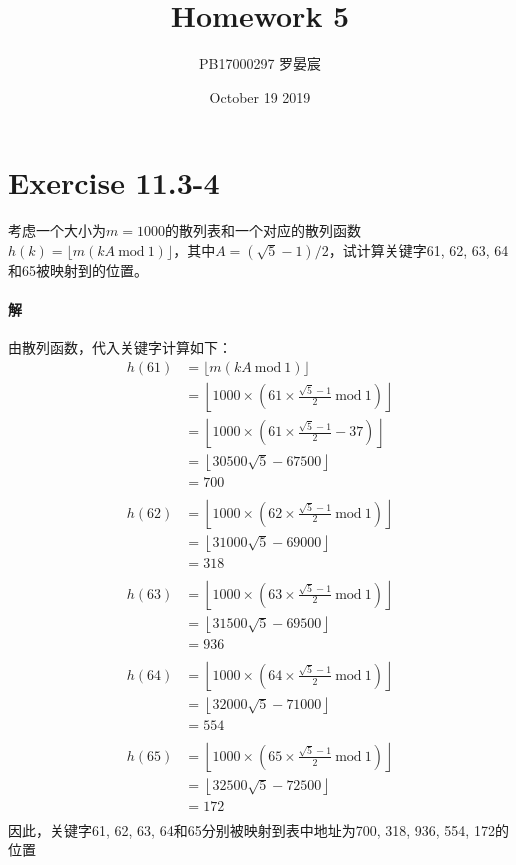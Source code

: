 \documentclass{article}
\title{Homework 5}
\author{PB17000297 罗晏宸}
\date{October 19 2019}
\begin{document}
\maketitle

\section{Exercise 11.3-4}
考虑一个大小为$m = 1000$的散列表和一个对应的散列函数$h(k) = \lfloor m(kA\ \text{mod}\ 1) \rfloor$，其中$A = (\sqrt{5} − 1)/2$，试计算关键字61, 62, 63, 64和65被映射到的位置。
\paragraph{解}
由散列函数，代入关键字计算如下：
\begin{align*}
    h(61)
        &= \lfloor m(kA\ \text{mod}\ 1) \rfloor \\
        &= \left \lfloor 1000 \times \left(61 \times \frac{\sqrt{5}-1}{2} \ \text{mod}\ 1 \right) \right \rfloor \\
        &= \left \lfloor 1000 \times \left( 61 \times \frac{\sqrt{5}-1}{2} - 37 \right) \right \rfloor \\
        &= \left \lfloor 30500\sqrt{5} - 67500 \right \rfloor \\
        &= 700 \\
    \\
    h(62)
        &= \left \lfloor 1000 \times \left(62 \times \frac{\sqrt{5}-1}{2} \ \text{mod}\ 1 \right) \right \rfloor \\
        &= \left \lfloor 31000\sqrt{5} - 69000 \right \rfloor \\
        &= 318 \\
    \\
    h(63)
        &= \left \lfloor 1000 \times \left(63 \times \frac{\sqrt{5}-1}{2} \ \text{mod}\ 1 \right) \right \rfloor \\
        &= \left \lfloor 31500\sqrt{5} - 69500 \right \rfloor \\
        &= 936 \\
        \\
    h(64)
        &= \left \lfloor 1000 \times \left(64 \times \frac{\sqrt{5}-1}{2} \ \text{mod}\ 1 \right) \right \rfloor \\
        &= \left \lfloor 32000\sqrt{5} - 71000 \right \rfloor \\
        &= 554 \\
        \\
    h(65)
        &= \left \lfloor 1000 \times \left(65 \times \frac{\sqrt{5}-1}{2} \ \text{mod}\ 1 \right) \right \rfloor \\
        &= \left \lfloor 32500\sqrt{5} - 72500 \right \rfloor \\
        &= 172 \\
\end{align*}
因此，关键字61, 62, 63, 64和65分别被映射到表中地址为700, 318, 936, 554, 172的位置
\end{document}
